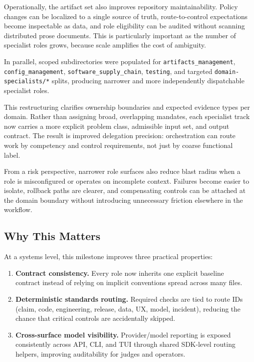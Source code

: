 \documentclass[12pt]{article}
\newcommand{\code}[1]{\texttt{#1}}
\begin{document}
Operationally, the artifact set also improves repository maintainability.
Policy changes can be localized to a single source of truth,
route-to-control expectations become inspectable as data, and role
eligibility can be audited without scanning distributed prose documents.
This is particularly important as the number of specialist roles grows,
because scale amplifies the cost of ambiguity.

\begin{sloppypar}
In parallel, scoped subdirectories were populated for
\code{artifacts\_management},
\code{config\_management},
\code{software\_supply\_chain},
\code{testing}, and targeted
\code{domain-specialists/*} splits, producing narrower and more
independently dispatchable specialist roles.
\end{sloppypar}

This restructuring clarifies ownership boundaries and expected evidence
types per domain. Rather than assigning broad, overlapping mandates,
each specialist track now carries a more explicit problem class,
admissible input set, and output contract. The result is improved
delegation precision: orchestration can route work by competency and
control requirements, not just by coarse functional label.

From a risk perspective, narrower role surfaces also reduce blast radius
when a role is misconfigured or operates on incomplete context. Failures
become easier to isolate, rollback paths are clearer, and compensating
controls can be attached at the domain boundary without introducing
unnecessary friction elsewhere in the workflow.

\subsection{Why This Matters}

At a systems level, this milestone improves three practical properties:
\begin{enumerate}
    \item \textbf{Contract consistency.}
          Every role now inherits one explicit baseline contract instead
          of relying on implicit conventions spread across many files.

    \item \textbf{Deterministic standards routing.}
          Required checks are tied to route IDs (claim, code,
          engineering, release, data, UX, model, incident), reducing the
          chance that critical controls are accidentally skipped.

    \item \textbf{Cross-surface model visibility.}
          Provider/model reporting is exposed consistently across API,
          CLI, and TUI through shared SDK-level routing helpers,
          improving auditability for judges and operators.
\end{enumerate}
\end{document}
